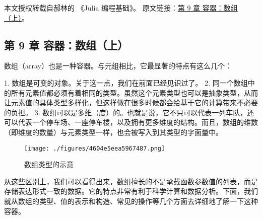 
本文授权转载自郝林的 《Julia 编程基础》。 原文链接：\href{https://github.com/hyper0x/JuliaBasics/blob/master/book/ch09.md}{第 9 章 容器：数组（上）}。


\subsection{第 9 章 容器：数组（上）}

数组（array）也是一种容器。与元组相比，它最显著的特点有这么几个：

1. 数组是可变的对象。关于这一点，我们在前面已经见识过了。
2. 同一个数组中的所有元素值都必须有着相同的类型。虽然这个元素类型也可以是抽象类型，从而让元素值的具体类型多样化，但这样做在很多时候都会给基于它的计算带来不必要的负担。
3. 数组可以是多维（度）的。也就是说，它不只可以代表一列车队，还可以代表一个停车场、一座停车楼，以及拥有更多维度的结构。而且，数组的维数（即维度的数量）与元素类型一样，也会被写入到其类型的字面量中。

\begin{figure}[ht]
\centering
\texttt{[image: ./figures/4604e5eea5967487.png]}
\caption{数组类型的示意} \label{fig_JuC9S0_1}
\end{figure}

从这些区别上，我们可以看得出来，数组擅长的不是承载函数参数值的列表，而是存储表达形式一致的数据。它的特点非常有利于科学计算和数据分析。下面，我们就从数组的类型、值的表示和构造、常见的操作等几个方面去详细地了解一下这种容器。